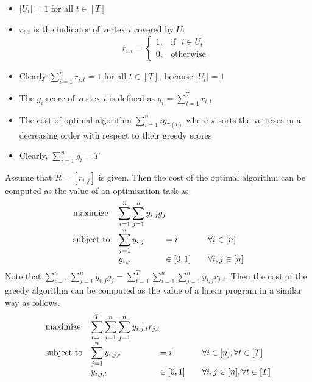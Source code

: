 \documentclass{article}
\begin{document}
\begin{itemize}
  \item $| U_t | =1$ for all $t \in [T]$
  \item $r_{i,t}$ is the indicator of vertex $i$ covered by $U_t$
  \[
  r_{i,t} = 
  \begin{cases}
  	1, & \mbox{if~~} i \in U_t \\
	0, & \mbox{otherwise}
  \end{cases}	
  \]
  \item Clearly $\sum_{i=1}^n r_{i,t} = 1$ for all $t \in [T]$, because $| U_t | =1$
  \item The $g_i$ score of vertex $i$ is defined as $g_i = \sum_{t=1}^T r_{i,t}$
  \item The cost of optimal algorithm $\sum_{i=1}^n i g_{\pi (i )}$ where $\pi$ sorts the vertexes in a decreasing order with respect to their greedy scores
  \item Clearly, $\sum_{i=1}^n g_i = T$
\end{itemize}
Assume that $R= [r_{i,j}]$ is given. Then the cost of the optimal algorithm can be computed as the value of an optimization task as:
\begin{equation*}
	\begin{array}{ll@{}ll}
	\text{maximize}  & \displaystyle \sum_{i=1}^{n} \sum_{j=1}^{n} y_{i,j} g_j \\ %
	\text{subject to}& \displaystyle \sum_{j=1}^{n} y_{i,j} & = i &\quad \forall i \in [n]  \\
	             &  y_{i,j} & \in [0,1] & \quad \forall i,j \in [n]
\end{array}
\end{equation*}
Note that $\sum_{i=1}^{n} \sum_{j=1}^{n} y_{i,j} g_j = \sum_{t=1}^T \sum_{i=1}^{n} \sum_{j=1}^{n} y_{i,j} r_{j,t}$. Then the cost of the greedy algorithm can be computed as the value of a linear program in a similar way as follows.
\begin{equation*}
	\begin{array}{ll@{}ll}
	\text{maximize}  & \displaystyle \sum_{t=1}^T \sum_{i=1}^{n} \sum_{j=1}^{n} y_{i,j,t} r_{j,t} \\ %
	\text{subject to}& \displaystyle \sum_{j=1}^{n} y_{i,j,t} & = i &\quad \forall i \in [n], \forall t \in [T]  \\
	             &  y_{i,j,t} & \in [0,1] & \quad \forall i,j \in [n], \forall t \in [T]
\end{array}
\end{equation*}
\end{document}
